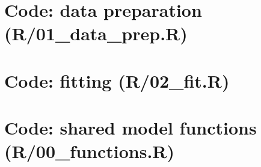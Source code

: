 \documentclass[10pt,a4paper]{article}
\begin{document}
\appendix\clearpage
\section{Code: data preparation (R/01\_data\_prep.R)}
\section{Code: fitting (R/02\_fit.R)}
\section{Code: shared model functions (R/00\_functions.R)}
{\footnotesize}
\end{document}
